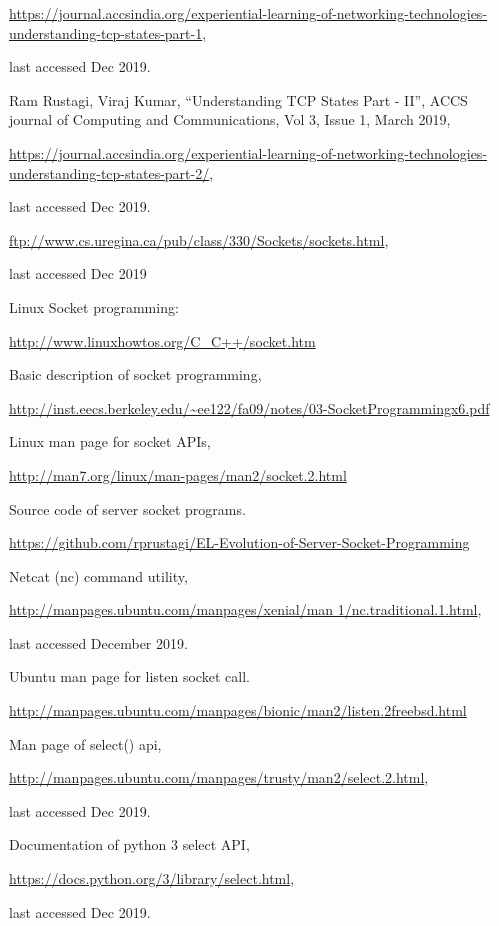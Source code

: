 \begin{multicols}{2}
\begin{thebibliography}{99}
\url{https://journal.accsindia.org/experiential-learning-of-networking-technologies-understanding-tcp-states-part-1},

last accessed Dec 2019.

 Ram Rustagi, Viraj Kumar, “Understanding TCP States Part - II”, ACCS journal of Computing and Communications, Vol 3, Issue 1, March 2019,

\url{https://journal.accsindia.org/experiential-learning-of-networking-technologies-understanding-tcp-states-part-2/},

last accessed Dec 2019.

 \url{ftp://www.cs.uregina.ca/pub/class/330/Sockets/sockets.html},

last accessed Dec 2019

 Linux Socket programming:

\url{http://www.linuxhowtos.org/C_C++/socket.htm}

 Basic description of socket programming, 

\url{http://inst.eecs.berkeley.edu/~ee122/fa09/notes/03-SocketProgrammingx6.pdf}

 Linux man page for socket APIs,

\url{http://man7.org/linux/man-pages/man2/socket.2.html}

  Source code of server socket programs. 

\url{https://github.com/rprustagi/EL-Evolution-of-Server-Socket-Programming}

 Netcat (nc) command utility,

\url{http://manpages.ubuntu.com/manpages/xenial/man 1/nc.traditional.1.html},

last accessed December 2019.

 Ubuntu man page for listen socket call. 

\url{http://manpages.ubuntu.com/manpages/bionic/man2/listen.2freebsd.html}

 Man page of select() api,

\url{http://manpages.ubuntu.com/manpages/trusty/man2/select.2.html},

last accessed Dec 2019.

 Documentation of python 3 select API,

\url{https://docs.python.org/3/library/select.html},

last accessed Dec 2019.
\end{thebibliography}
\end{multicols}


